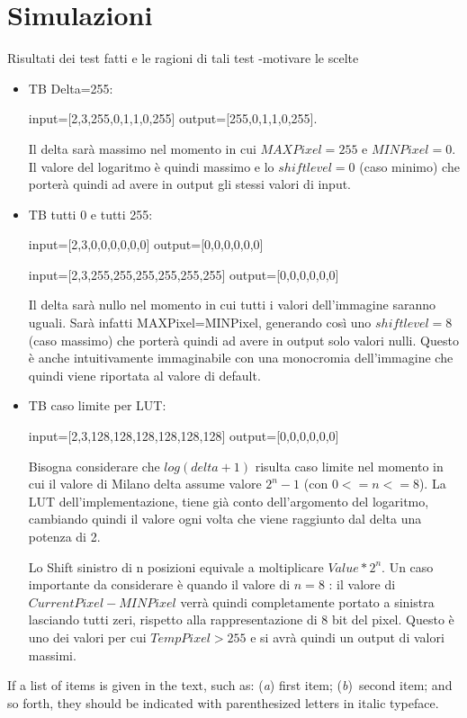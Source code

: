 \documentclass{article}
\begin{document}
\section{Simulazioni}
\label{main-text}
Risultati  dei  test  fatti  e  le ragioni di tali test -motivare le scelte
\begin{itemize}
\item TB Delta=255:

 input=[2,3,255,0,1,1,0,255]
 output=[255,0,1,1,0,255].    
    
   Il delta sarà massimo nel momento in cui \(MAXPixel = 255\) e \(MINPixel = 0\). Il valore del logaritmo è quindi massimo e lo \(shiftlevel=0\) (caso minimo) che porterà quindi ad avere in output gli stessi valori di input.
\item TB tutti 0 e tutti 255:

 input=[2,3,0,0,0,0,0,0] 
 output=[0,0,0,0,0,0]
 
  input=[2,3,255,255,255,255,255,255] 
 output=[0,0,0,0,0,0]
 
 Il delta sarà nullo nel momento in cui tutti i valori dell'immagine saranno uguali. Sarà infatti MAXPixel=MINPixel, generando così uno \(shiftlevel=8\) (caso massimo) che porterà quindi ad avere in output solo valori nulli. Questo è anche intuitivamente immaginabile con una monocromia dell'immagine che quindi viene riportata al valore di default.
 \item TB caso limite per LUT:
 
 input=[2,3,128,128,128,128,128,128] 
 output=[0,0,0,0,0,0]
 
 Bisogna considerare che \(log (delta +1)\) risulta caso limite nel momento in cui il valore di Milano delta assume valore \(2^{n}-1\) (con \(0<=n<=8\)). La LUT dell'implementazione, tiene già conto dell'argomento del logaritmo, cambiando quindi il valore ogni volta che viene raggiunto dal delta una potenza di 2.  
 
 Lo Shift sinistro di n posizioni equivale a moltiplicare \(Value*2^{n}\). Un caso importante da considerare è quando il valore di \(n=8\) : il valore di \(Current Pixel-MINPixel\) verrà quindi completamente portato a sinistra lasciando tutti zeri, rispetto alla rappresentazione di 8 bit del pixel. Questo è uno dei valori per cui \(Temp Pixel>255\) e si avrà quindi un output di valori massimi.

 
\end{itemize}
If a list of items is given in the text, such as: (\textit{a}) first item; (\textit{b})~second item; and so forth, they should be indicated with parenthesized letters in italic typeface.
\end{document}
